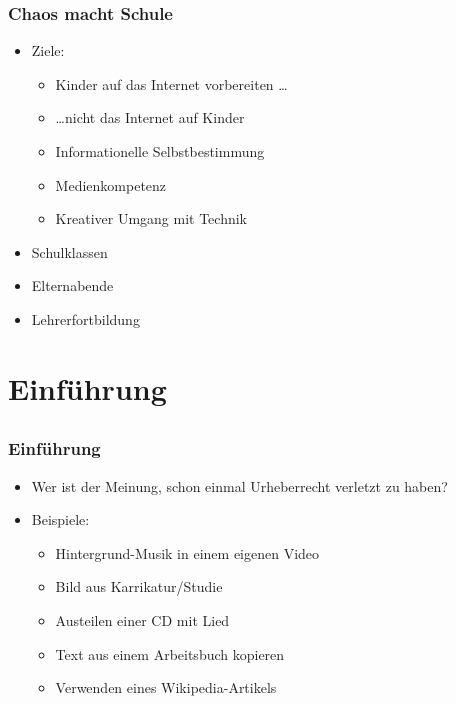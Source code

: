 \documentclass{beamer}
\begin{document}
\begin{frame}
    \frametitle{Chaos macht Schule}
    \begin{itemize}
        \item<2->Ziele:
            \begin{itemize}
                \item<3-> Kinder auf das Internet vorbereiten \ldots
                \item<4-> \ldots nicht das Internet auf Kinder
                \item<5-> Informationelle Selbstbestimmung
                \item<6-> Medienkompetenz
                \item<7-> Kreativer Umgang mit Technik
            \end{itemize}
        \item<8-> Schulklassen
        \item<9-> Elternabende
        \item<10-> Lehrerfortbildung
    \end{itemize}
\end{frame}

\section{Einführung}
\subsection{}

\begin{frame}
    \frametitle{Einführung}
    \begin{itemize}
        \item<2-> Wer ist der Meinung, schon einmal Urheberrecht verletzt zu haben?
        \item<3-> Beispiele:
        \begin{itemize}
          \item<2-> Hintergrund-Musik in einem eigenen Video
          \item<3-> Bild aus Karrikatur/Studie
          \item<4-> Austeilen einer CD mit Lied
          \item<5-> Text aus einem Arbeitsbuch kopieren
          \item<6-> Verwenden eines Wikipedia-Artikels
        \end{itemize}
    \end{itemize}
\end{frame}
\end{document}
